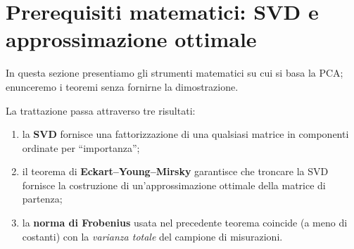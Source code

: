 \documentclass[11pt,a4paper]{article}
\theoremstyle{plain}
\theoremstyle{definition}
\theoremstyle{remark}
\begin{document}


\section{Prerequisiti matematici: SVD e approssimazione ottimale}

In questa sezione presentiamo gli strumenti matematici su cui si basa la PCA;
enunceremo i teoremi senza fornirne la dimostrazione. \newline



La trattazione passa attraverso tre risultati:
\begin{enumerate}
  \item la \textbf{SVD} fornisce una fattorizzazione di una qualsiasi matrice in componenti ordinate
        per ``importanza'';
  \item il teorema di \textbf{Eckart--Young--Mirsky} garantisce che troncare
      la SVD fornisce la costruzione di un'approssimazione ottimale
      della matrice di partenza;
  \item la \textbf{norma di Frobenius} usata nel precedente teorema coincide
        (a meno di costanti) con la \emph{varianza totale} del campione di misurazioni.
\end{enumerate}

\medskip
\end{document}

